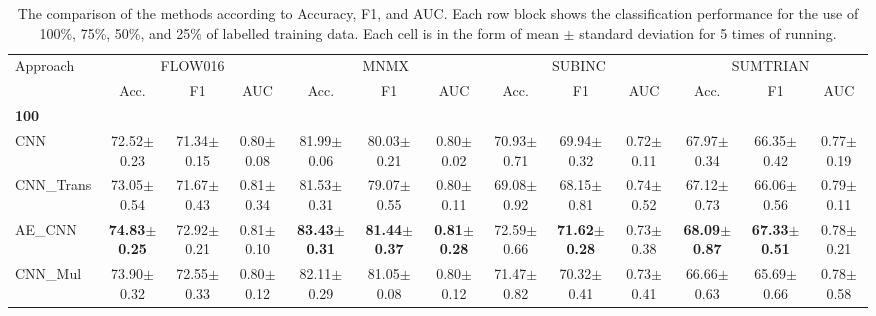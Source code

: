\begin{table}[ht]
\centering
\caption{The comparison of the methods according to Accuracy, F1, and AUC. Each row block shows the classification performance for the use of 100\%, 75\%, 50\%, and 25\% of labelled training data. Each cell is in the form of mean $\pm$ standard deviation for 5 times of running.}
\label{tab:results}
\begin{adjustbox}{width=\textwidth}
\begin{tabular}{lcccccccccccc}
\hline
\multirow{2}{*}{Approach} & \multicolumn{3}{c}{FLOW016}                                    & \multicolumn{3}{c}{MNMX}                                       & \multicolumn{3}{c}{SUBINC}                                     & \multicolumn{3}{c}{SUMTRIAN}                                   \\ \cline{2-13} 
                          & Acc.                & F1                  & AUC                & Acc.                & F1                  & AUC                & Acc.                & F1                  & AUC                & Acc.                & F1                  & AUC                \\ \hline
\textbf{100}&&&&&&&&&&&& \\
CNN                  & 72.52$\pm$0.23          & 71.34$\pm$0.15          & 0.80$\pm$0.08          & 81.99$\pm$0.06          & 80.03$\pm$0.21          & 0.80$\pm$0.02          & 70.93$\pm$0.71          & 69.94$\pm$0.32          & 0.72$\pm$0.11          & 67.97$\pm$0.34          & 66.35$\pm$0.42          & 0.77$\pm$0.19          \\
CNN\_Trans        & 73.05$\pm$0.54          & 71.67$\pm$0.43          & 0.81$\pm$0.34          & 81.53$\pm$0.31          & 79.07$\pm$0.55          & 0.80$\pm$0.11          & 69.08$\pm$0.92          & 68.15$\pm$0.81          & 0.74$\pm$0.52          & 67.12$\pm$0.73          & 66.06$\pm$0.56          & 0.79$\pm$0.11          \\
AE\_CNN              & \textbf{74.83$\pm$0.25} & 72.92$\pm$0.21          & 0.81$\pm$0.10          & \textbf{83.43$\pm$0.31} & \textbf{81.44$\pm$0.37} & \textbf{0.81$\pm$0.28} & 72.59$\pm$0.66          & \textbf{71.62$\pm$0.28} & 0.73$\pm$0.38          & \textbf{68.09$\pm$0.87} & \textbf{67.33$\pm$0.51} & 0.78$\pm$0.21 \\
CNN\_Mul       & 73.90$\pm$0.32          & 72.55$\pm$0.33          & 0.80$\pm$0.12          & 82.11$\pm$0.29          & 81.05$\pm$0.08          & 0.80$\pm$0.12          & 71.47$\pm$0.82          & 70.32$\pm$0.41          & 0.73$\pm$0.41          & 66.66$\pm$0.63          & 65.69$\pm$0.66          & 0.78$\pm$0.58          \\

\end{tabular}
\end{adjustbox}
\end{table}

